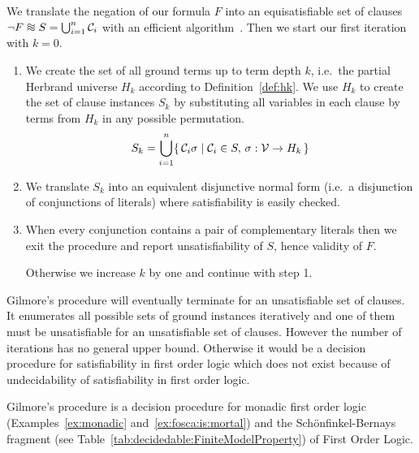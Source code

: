 \begin{procedure}\label{proc:gilmore's:prover}
	We translate the negation of our formula \( F \) into an equisatisfiable set of clauses
	\( \lnot F \equisat S = \bigcup_{i=1}^{n} \mcC_i \) with an efficient algorithm~\cite{tseitin70, PLAISTED1986293}.
	Then we start our first iteration with \( k=0 \).
	\begin{enumerate}

		\item We create the set of all ground terms up to term depth \( k \),
		i.e.~the partial Herbrand universe \( H_k \) according to Definition~\ref{def:hk}.
		We use \( H_k \) to create the set of clause instances \( S_k \)
		by substituting all variables
		in each clause by terms from \( H_k \) in any possible permutation.
		\[ S_k = \bigcup_{i=1}^{n}
		 \{ \,
		\mathcal{C}_i\sigma \mid \mathcal{C}_i \in S, \, \sigma: \mathcal{V}\to H_k
		 \, \}
		\]

		\item We translate \( S_k \) into an equivalent disjunctive normal form
		(i.e.~a disjunction of conjunctions of literals)
		where satisfiability is easily checked.



		\item When every conjunction contains a pair of complementary literals
		then we exit the procedure and report unsatisfiability of \( S \),
		hence validity of \( F \).

		Otherwise we increase \( k \) by one and continue with step 1.
	\end{enumerate}
\end{procedure}

Gilmore's procedure will eventually terminate for an unsatisfiable set of clauses.
It enumerates all possible sets of ground instances iteratively
and one of them must be unsatisfiable for an unsatisfiable set of clauses.
However the number of iterations has no general upper bound.
Otherwise it would be a decision procedure for satisfiability in first order logic
which does not exist because of undecidability of satisfiability in first order logic.

\begin{lemma}
	Gilmore's procedure is a decision procedure for monadic first order logic
	(Examples~\ref{ex:monadic} and~\ref{ex:fosca:is:mortal})
	and the Schönfinkel-Bernays fragment
	(see Table~\ref{tab:decidedable:FiniteModelProperty})
	of First Order Logic.
\end{lemma}

